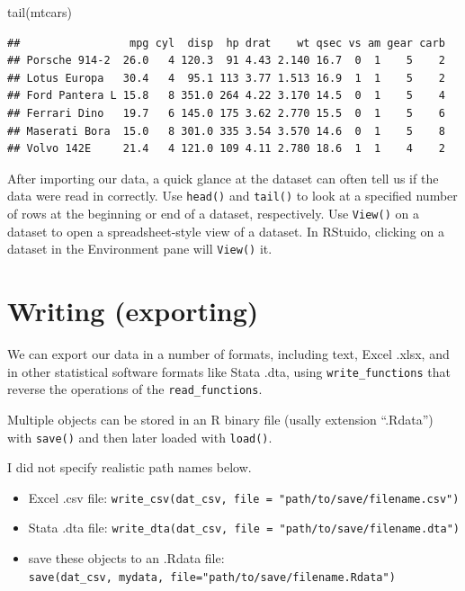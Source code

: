 \documentclass[
]{book}
\newenvironment{Shaded}{\begin{snugshade}}{\end{snugshade}}
\newcommand{\FunctionTok}[1]{\textcolor[rgb]{0.00,0.00,0.00}{#1}}
\newcommand{\NormalTok}[1]{#1}
\providecommand{\tightlist}{%
  \setlength{\itemsep}{0pt}\setlength{\parskip}{0pt}}
\theoremstyle{definition}
\theoremstyle{definition}
\theoremstyle{definition}
\theoremstyle{definition}
\theoremstyle{remark}
\begin{document}
\begin{Shaded}
\begin{Highlighting}[]
\FunctionTok{tail}\NormalTok{(mtcars)}
\end{Highlighting}
\end{Shaded}

\begin{verbatim}
##                 mpg cyl  disp  hp drat    wt qsec vs am gear carb
## Porsche 914-2  26.0   4 120.3  91 4.43 2.140 16.7  0  1    5    2
## Lotus Europa   30.4   4  95.1 113 3.77 1.513 16.9  1  1    5    2
## Ford Pantera L 15.8   8 351.0 264 4.22 3.170 14.5  0  1    5    4
## Ferrari Dino   19.7   6 145.0 175 3.62 2.770 15.5  0  1    5    6
## Maserati Bora  15.0   8 301.0 335 3.54 3.570 14.6  0  1    5    8
## Volvo 142E     21.4   4 121.0 109 4.11 2.780 18.6  1  1    4    2
\end{verbatim}

After importing our data, a quick glance at the dataset can often tell us if the data were read in correctly. Use \texttt{head()} and \texttt{tail()} to look at a specified number of rows at the beginning or end of a dataset, respectively. Use \texttt{View()} on a dataset to open a spreadsheet-style view of a dataset. In RStuido, clicking on a dataset in the Environment pane will \texttt{View()} it.

\hypertarget{writing-exporting}{%
\section{Writing (exporting)}\label{writing-exporting}}

We can export our data in a number of formats, including text, Excel .xlsx, and in other statistical software formats like Stata .dta, using \texttt{write\_functions} that reverse the operations of the \texttt{read\_functions}.

Multiple objects can be stored in an R binary file (usally extension ``.Rdata'') with \texttt{save()} and then later loaded with \texttt{load()}.

I did not specify realistic path names below.

\begin{itemize}
\tightlist
\item
  Excel .csv file: \texttt{write\_csv(dat\_csv,\ file\ =\ "path/to/save/filename.csv")}
\item
  Stata .dta file: \texttt{write\_dta(dat\_csv,\ file\ =\ "path/to/save/filename.dta")}
\item
  save these objects to an .Rdata file: \texttt{save(dat\_csv,\ mydata,\ file="path/to/save/filename.Rdata")}
\end{itemize}
\end{document}
